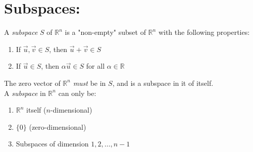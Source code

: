 \section{\small Subspaces:}
A \textit{subspace} $S$ of $\mathbb{R}^n$ is a "non-empty" subset of
$\mathbb{R}^n$ with the following properties:
\begin{enumerate}[label=(\roman*)]
	\item If $\vec{u}, \vec{v} \in S$, then $\vec{u} + \vec{v} \in S$
	\item If $\vec{u} \in S$, then $\alpha \vec{u} \in S$ for all $\alpha \in \mathbb{R}$
\end{enumerate}
The zero vector of $\mathbb{R}^n$ \textit{must} be in $S$, and is a subspace in
it of itself.\\

A \textit{subspace} in $\mathbb{R}^n$ can only be:
\begin{enumerate}[label=(\roman*)]
	\item $\mathbb{R}^n$ itself ($n$-dimensional)
	\item $\{0\}$ (zero-dimensional)
	\item Subspaces of dimension $1, 2, \dots, n-1$
\end{enumerate}
